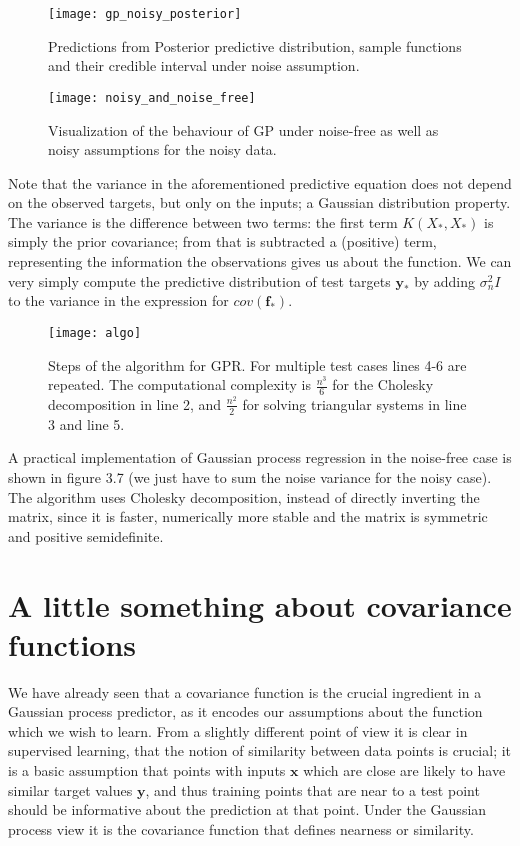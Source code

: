 \documentclass[12pt,a4paper,oneside]{book}
\theoremstyle{plain}
\theoremstyle{definition}
\begin{document}
{\begin{figure}[ht]
\begin{center}
\texttt{[image: gp\_noisy\_posterior]}
\caption{Predictions from Posterior predictive distribution, sample functions and their credible interval under noise assumption.}
\end{center}
\end{figure}
\begin{figure}[ht]
\begin{center}
\texttt{[image: noisy\_and\_noise\_free]}
\caption{Visualization of the behaviour of GP under noise-free as well as noisy assumptions for the noisy data.}
\end{center}
\end{figure}
\vspace{3mm}
Note that the variance in the aforementioned predictive equation does not depend on the observed targets, but only on the inputs; a Gaussian distribution property. The variance is the difference between two terms: the first term $K(X_*,X_*)$ is simply the prior covariance; from that is subtracted a (positive) term, representing the information the observations gives us about the function. We can very simply compute the predictive distribution of test targets $\bm{y}_*$ by adding $\sigma_n^2I$ to the variance in the expression for $cov(\bm{f}_*).$
\begin{figure}[h]
\begin{center}
\texttt{[image: algo]}
\caption{Steps of the algorithm for GPR. For multiple test cases lines 4-6 are repeated. The computational complexity is $\frac{n^3}{6}$ for the Cholesky decomposition in line 2, and $\frac{n^2}{2}$ for solving triangular systems in line 3 and line 5.}
\end{center}
\end{figure}

\vspace{3mm}
A practical implementation of Gaussian process regression in the noise-free case is shown in figure 3.7 (we just have to sum the noise variance for the noisy case). The algorithm uses Cholesky decomposition, instead of directly inverting the matrix, since it is faster, numerically more stable and the matrix is symmetric and positive semidefinite. 
  
\section{A little something about covariance functions}
We have already seen that a covariance function is the crucial ingredient in a Gaussian process predictor, as it encodes our assumptions about the function which we wish to learn. From a slightly different point of view it is clear in supervised learning, that the notion of similarity between data points is crucial; it is a basic assumption that points with inputs $\bm{x}$ which are close are likely to have similar target values $\bm{y}$, and thus training points that are near to a test point should be informative about the prediction at that point. Under the Gaussian process view it is the covariance function that defines nearness or similarity. 

}
\end{document}
